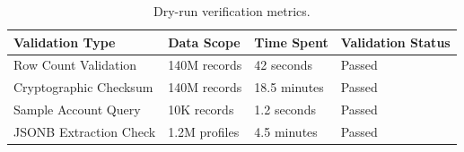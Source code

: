 \begin{table}[h]
\small
\centering
\begin{tabularx}{\textwidth}{L{4cm} C{2.5cm} C{2.5cm} Y}
\toprule
\textbf{Validation Type} & \textbf{Data Scope} & \textbf{Time Spent} & \textbf{Validation Status} \\
\midrule
Row Count Validation & 140M records & 42 seconds & Passed \\
Cryptographic Checksum & 140M records & 18.5 minutes & Passed \\
Sample Account Query & 10K records & 1.2 seconds & Passed \\
JSONB Extraction Check & 1.2M profiles & 4.5 minutes & Passed \\
\bottomrule
\end{tabularx}
\caption{Dry-run verification metrics.}
\label{tab:validation_metrics}
\end{table}
